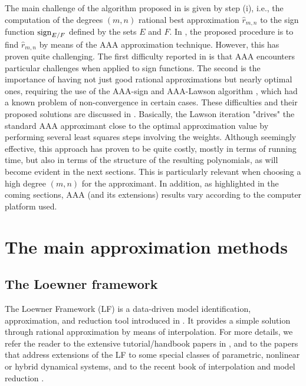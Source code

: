 The main challenge of the algorithm proposed in \cite{trefethen2024computation} is given by step (i), i.e., the computation of the degrees $(m,n)$ rational best approximation $\hat r_{m,n}$ to the sign function $\mathrm{sign}_{E/F}$ defined by the sets $E$ and $F$.  In \cite{trefethen2024computation}, the proposed procedure is to find $\hat r_{m,n}$ by means of the AAA approximation technique.  However, this has proven quite challenging. The first difficulty reported in \cite{trefethen2024computation} is that AAA encounters particular challenges when applied to sign functions. The second is the importance of having not just good rational approximations but nearly optimal ones, requiring the use of the AAA-sign and AAA-Lawson algorithm \cite{nakatsukasa2020algorithm}, which had a known problem of non-convergence in certain cases. These difficulties and their proposed solutions are discussed in \cite[\S 3.1 and \S 3.2]{trefethen2024computation}. Basically, the Lawson iteration "drives" the standard AAA approximant close to the optimal approximation value by performing several least squares steps involving  the weights. Although seemingly effective, this approach has proven to be quite costly, mostly in terms of running time, but also in terms of the structure of the resulting polynomials, as will become evident in the next sections. This is particularly relevant when choosing a high degree $(m,n)$ for the approximant. In addition, as highlighted in the coming sections, AAA (and its extensions) results vary according to the computer platform used.

\section{The main approximation methods}\label{sec:ratapp}


\subsection{The Loewner framework}\label{sec:Loew}

The Loewner Framework (LF) is a data-driven model identification, approximation, and reduction tool introduced in \cite{ajm07}. It provides a simple solution through rational approximation by means of interpolation. For more details, we refer the reader to the extensive tutorial/handbook papers in \cite{morKarGA19a,morGosPA22,ali17}, and to the papers \cite{morIonA14,AGPV:2025,morAntGI16,morKarGGetal25} that address extensions of the LF to some special classes of parametric, nonlinear or hybrid dynamical systems, and to  the recent book of interpolation and model reduction \cite[chapter 4]{abg_book}. 

